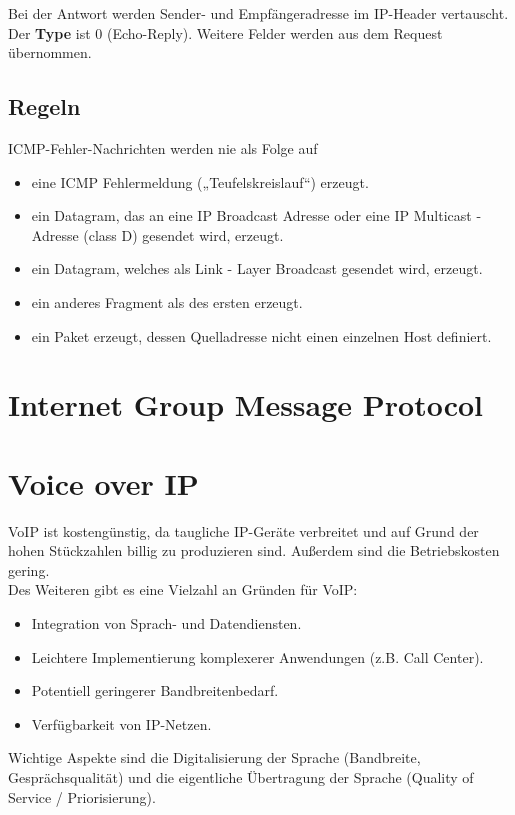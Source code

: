 \documentclass{article} %
\begin{document}
Bei der Antwort werden Sender- und Empfängeradresse im IP-Header vertauscht.
Der \textbf{Type} ist 0 (Echo-Reply).
Weitere Felder werden aus dem Request übernommen.

\subsection{Regeln}
ICMP-Fehler-Nachrichten werden nie als Folge auf
\begin{itemize}
\item  eine ICMP Fehlermeldung („Teufelskreislauf“) erzeugt.
\item  ein Datagram, das an eine IP Broadcast Adresse oder eine IP
Multicast - Adresse (class D) gesendet wird, erzeugt.
\item  ein Datagram, welches als Link - Layer Broadcast gesendet
wird, erzeugt.
\item  ein anderes Fragment als des ersten erzeugt.
\item  ein Paket erzeugt, dessen Quelladresse nicht einen einzelnen Host definiert.
\end{itemize}


\section{Internet Group Message Protocol}

\section{Voice over IP}
VoIP ist kostengünstig, da taugliche IP-Geräte verbreitet und auf Grund der hohen Stückzahlen billig zu produzieren sind. Außerdem sind die Betriebskosten gering.\\
Des Weiteren gibt es eine Vielzahl an Gründen für VoIP: 
\begin{itemize}
	\item Integration von Sprach- und Datendiensten.
	\item Leichtere Implementierung komplexerer Anwendungen	(z.B. Call Center).
	\item Potentiell geringerer Bandbreitenbedarf.
	\item Verfügbarkeit von IP-Netzen.
\end{itemize}
Wichtige Aspekte sind die Digitalisierung der Sprache (Bandbreite, Gesprächsqualität) und die eigentliche Übertragung der Sprache (Quality of Service / Priorisierung).
\end{document}

